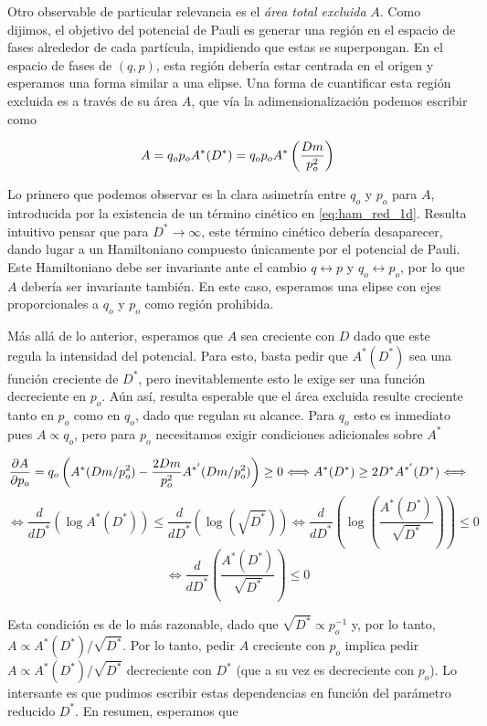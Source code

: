 Otro observable de particular relevancia es el \textit{área total excluida} $A$.
Como dijimos, el objetivo del potencial de Pauli es generar una región en el espacio de fases alrededor de cada partícula, impidiendo que estas se superpongan.
En el espacio de fases de $(q,p)$, esta región debería estar centrada en el origen y esperamos una forma similar a una elipse.
Una forma de cuantificar esta región excluida es a través de su área $A$, que vía la adimensionalización podemos escribir como

\begin{equation}{\label{eq:area_red}}
A = q_op_oA^*(D^*) = q_op_oA^*\left( \frac{Dm}{p_o^2} \right)
\end{equation}

Lo primero que podemos observar es la clara asimetría entre $q_o$ y $p_o$ para $A$, introducida por la existencia de un término cinético en \eqref{eq:ham_red_1d}.
Resulta intuitivo pensar que para $D^*\to\infty$, este término cinético debería desaparecer, dando lugar a un Hamiltoniano compuesto únicamente por el potencial de Pauli.
Este Hamiltoniano debe ser invariante ante el cambio $q\leftrightarrow p$ y $q_o\leftrightarrow p_o$, por lo que $A$ debería ser invariante también.
En este caso, esperamos una elipse con ejes proporcionales a $q_o$ y $p_o$ como región prohibida.

Más allá de lo anterior, esperamos que $A$ sea creciente con $D$ dado que este regula la intensidad del potencial.
Para esto, basta pedir que $A^*(D^*)$ sea una función creciente de $D^*$, pero inevitablemente esto le exige ser una función decreciente en $p_o$.
Aún así, resulta esperable que el área excluida resulte creciente tanto en $p_o$ como en $q_o$, dado que regulan su alcance.
Para $q_o$ esto es inmediato pues $A\propto q_o$, pero para $p_o$ necesitamos exigir condiciones adicionales sobre $A^*$

\[ \frac{\partial A}{\partial p_o} = q_o\left( A^*(Dm/p_o^2) - \frac{2Dm}{p_o^2}A^{*'}(Dm/p_o^2) \right) \geq 0 \Longleftrightarrow A^*(D^*) \geq 2D^* A^{*'}(D^*) \Longleftrightarrow \]
\[ \Longleftrightarrow  \frac{d}{dD^*} \left(\log A^*(D^*) \right) \leq \frac{d}{dD^*} \left(\log \left(\sqrt{D^*}\right) \right)
\Longleftrightarrow \frac{d}{dD^*} \left(\log \left(\frac{A^*(D^*)}{\sqrt{D^*}}\right) \right) \leq 0\]
\[\Longleftrightarrow \frac{d}{dD^*} \left(\frac{A^*(D^*)}{\sqrt{D^*}}\right) \leq 0 \]

Esta condición es de lo más razonable, dado que $\sqrt{D^*}\propto p_o^{-1}$ y, por lo tanto, $A\propto A^*(D^*)/\sqrt{D^*}$.
Por lo tanto, pedir $A$ creciente con $p_o$ implica pedir $A\propto A^*(D^*)/\sqrt{D^*}$ decreciente con $D^*$ (que a su vez es decreciente con $p_o$).
Lo intersante es que pudimos escribir estas dependencias en función del parámetro reducido $D^*$.
En resumen, esperamos que

